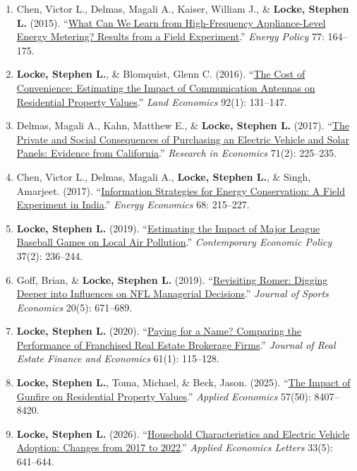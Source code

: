 \documentclass[10pt]{article}
\begin{document}
\begin{enumerate}
\item Chen, Victor L., Delmas, Magali A., Kaiser, William J., \& \textbf{Locke, Stephen L.} (2015). ``\href{https://doi.org/10.1016/j.enpol.2014.11.021}{What Can We Learn from High-Frequency Appliance-Level Energy Metering? Results from a Field Experiment}.'' \emph{Energy Policy} 77: 164--175. %
\item \textbf{Locke, Stephen L.}, \& Blomquist, Glenn C. (2016). ``\href{https://doi.org/10.3368/le.92.1.131}{The Cost of Convenience: Estimating the Impact of Communication Antennas on Residential Property Values}.'' \emph{Land Economics} 92(1): 131--147. %
\item Delmas, Magali A., Kahn, Matthew E., \& \textbf{Locke, Stephen L.} (2017). ``\href{https://doi.org/10.1016/j.rie.2016.12.002}{The Private and Social Consequences of Purchasing an Electric Vehicle and Solar Panels: Evidence from California}.'' \emph{Research in Economics} 71(2): 225--235. %
\item Chen, Victor L., Delmas, Magali A., \textbf{Locke, Stephen L.}, \& Singh, Amarjeet. (2017). ``\href{https://doi.org/10.1016/j.eneco.2017.09.004}{Information Strategies for Energy Conservation: A Field Experiment in India}.'' \emph{Energy Economics} 68: 215--227. %
\item \textbf{Locke, Stephen L.} (2019). ``\href{https://doi.org/10.1111/coep.12404}{Estimating the Impact of Major League Baseball Games on Local Air Pollution}.'' \emph{Contemporary Economic Policy} 37(2): 236--244. %
\item Goff, Brian, \& \textbf{Locke, Stephen L.} (2019). ``\href{https://doi.org/10.1177/1527002518798686}{Revisiting Romer: Digging Deeper into Influences on NFL Managerial Decisions}.'' \emph{Journal of Sports Economics} 20(5): 671--689. %
\item \textbf{Locke, Stephen L.} (2020). ``\href{https://doi.org/10.1007/s11146-019-09702-2}{Paying for a Name? Comparing the Performance of Franchised Real Estate Brokerage Firms}.'' \emph{Journal of Real Estate Finance and Economics} 61(1): 115--128. %
\item \textbf{Locke, Stephen L.}, Toma, Michael, \& Beck, Jason. (2025). ``\href{https://doi.org/10.1080/00036846.2024.2399816}{The Impact of Gunfire on Residential Property Values}.'' \emph{Applied Economics} 57(50): 8407--8420.
\item \textbf{Locke, Stephen L.} (2026). ``\href{https://doi.org/10.1080/13504851.2024.2386149}{Household Characteristics and Electric Vehicle Adoption: Changes from 2017 to 2022}.'' \emph{Applied Economics Letters} 33(5): 641--644.

\end{enumerate}
\end{document}

